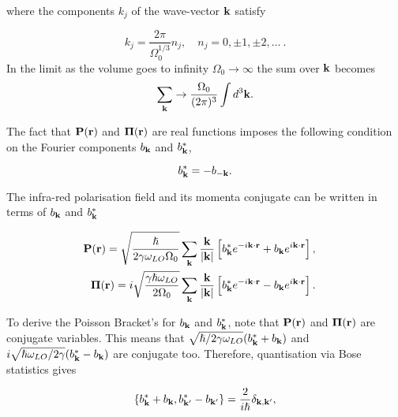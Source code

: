 where the components $k_j$ of the wave-vector $\vb{k}$ satisfy

\begin{equation}
    k_j = \frac{2\pi}{\Omega_0^{1/3}} n_j, \quad n_j = 0, \pm 1, \pm 2, \dots \ .
\end{equation}
In the limit as the volume goes to infinity $\Omega_0 \to \infty$ the sum over $\vb{k}$ becomes
\begin{equation}
    \sum_{\vb{k}} \rightarrow \frac{\Omega_0}{(2\pi)^3} \int d^3 \vb{k}.
\end{equation}

The fact that $\vb{P}(\vb{r})$ and $\vb{\Pi}(\vb{r})$ are real functions imposes the following condition on the Fourier components $b_{\vb{k}}$ and $b^*_{\vb{k}}$,

\begin{equation}
    b^*_{\vb{k}} = -b_{-\vb{k}}.
\end{equation}

The infra-red polarisation field and its momenta conjugate can be written in terms of $b_{\vb{k}}$ and $b^*_{\vb{k}}$ 

\begin{subequations}
\begin{align}
    \begin{split}
        \vb{P}(\vb{r}) &= \sqrt{\frac{\hslash}{2\gamma\omega_{LO}\Omega_0}} \sum_{\vb{k}} \frac{\vb{k}}{\abs{\vb{k}}} \left[b^*_{\vb{k}}e^{-i\vb{k}\cdot\vb{r}} + b_{\vb{k}} e^{i\vb{k}\cdot\vb{r}}\right],
    \end{split}\\
    \begin{split}
        \vb{\Pi}(\vb{r}) &= i\sqrt{\frac{\gamma\hslash\omega_{LO}}{2\Omega_0}} \sum_{\vb{k}} \frac{\vb{k}}{\abs{\vb{k}}} \left[b^*_{\vb{k}}e^{-i\vb{k}\cdot\vb{r}} - b_{\vb{k}} e^{i\vb{k}\cdot\vb{r}}\right].
    \end{split}
\end{align}
\end{subequations}

To derive the Poisson Bracket's for $b_{\vb{k}}$ and $b_{\vb{k}}^*$, note that $\vb{P}(\vb{r})$ and $\vb{\Pi}(\vb{r})$ are conjugate variables. This means that $\sqrt{\hslash / 2\gamma \omega_{LO}} (b_{\vb{k}}^* + b_{\vb{k}})$ and  $i\sqrt{\hslash \omega_{LO} / 2\gamma} (b_{\vb{k}}^* - b_{\vb{k}})$ are conjugate too. Therefore, quantisation via Bose statistics gives

\begin{equation}
    \left\{b_{\vb{k}}^* + b_{\vb{k}}, b_{\vb{k'}}^* - b_{\vb{k'}}\right\} = \frac{2}{i\hslash} \delta_{\vb{k}, \vb{k'}},
\end{equation}

